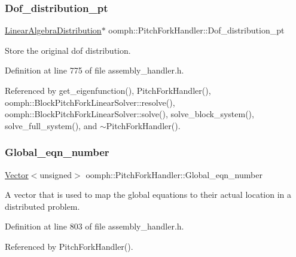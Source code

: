 \subsubsection{\texorpdfstring{Dof\+\_\+distribution\+\_\+pt}{Dof\_distribution\_pt}}
{\footnotesize\ttfamily \hyperlink{classoomph_1_1LinearAlgebraDistribution}{Linear\+Algebra\+Distribution}$\ast$ oomph\+::\+Pitch\+Fork\+Handler\+::\+Dof\+\_\+distribution\+\_\+pt\hspace{0.3cm}{\ttfamily [private]}}



Store the original dof distribution. 



Definition at line 775 of file assembly\+\_\+handler.\+h.



Referenced by get\+\_\+eigenfunction(), Pitch\+Fork\+Handler(), oomph\+::\+Block\+Pitch\+Fork\+Linear\+Solver\+::resolve(), oomph\+::\+Block\+Pitch\+Fork\+Linear\+Solver\+::solve(), solve\+\_\+block\+\_\+system(), solve\+\_\+full\+\_\+system(), and $\sim$\+Pitch\+Fork\+Handler().

\mbox{\label{classoomph_1_1PitchForkHandler_ac7010a8c64237d76cb0f23bfad126e07}} 
\subsubsection{\texorpdfstring{Global\+\_\+eqn\+\_\+number}{Global\_eqn\_number}}
{\footnotesize\ttfamily \hyperlink{classoomph_1_1Vector}{Vector}$<$unsigned$>$ oomph\+::\+Pitch\+Fork\+Handler\+::\+Global\+\_\+eqn\+\_\+number\hspace{0.3cm}{\ttfamily [private]}}



A vector that is used to map the global equations to their actual location in a distributed problem. 



Definition at line 803 of file assembly\+\_\+handler.\+h.



Referenced by Pitch\+Fork\+Handler().

\mbox{\label{classoomph_1_1PitchForkHandler_a9314a176be55e7e9c5a359accfbec751}} 

